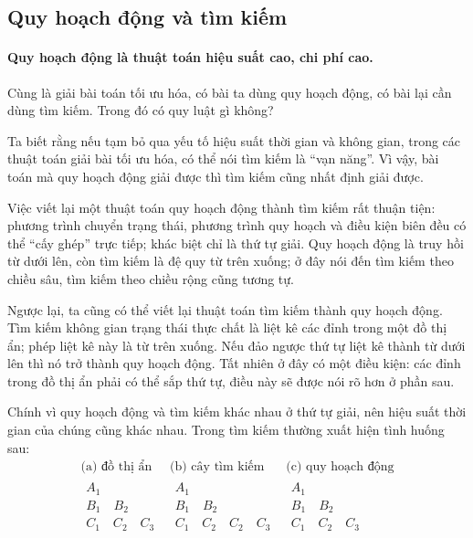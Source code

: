 \documentclass[11pt]{article}
\begin{document}
\subsection{Quy hoạch động và tìm kiếm}

\paragraph{Quy hoạch động là thuật toán hiệu suất cao, chi phí cao.}
Cùng là giải bài toán tối ưu hóa, có bài ta dùng quy hoạch động, có bài lại
cần dùng tìm kiếm. Trong đó có quy luật gì không?

Ta biết rằng nếu tạm bỏ qua yếu tố hiệu suất thời gian và không gian, trong
các thuật toán giải bài tối ưu hóa, có thể nói tìm kiếm là ``vạn năng''. Vì
vậy, bài toán mà quy hoạch động giải được thì tìm kiếm cũng nhất định giải
được.

Việc viết lại một thuật toán quy hoạch động thành tìm kiếm rất thuận tiện:
phương trình chuyển trạng thái, phương trình quy hoạch và điều kiện biên đều
có thể ``cấy ghép'' trực tiếp; khác biệt chỉ là thứ tự giải. Quy hoạch động
là truy hồi từ dưới lên, còn tìm kiếm là đệ quy từ trên xuống; ở đây nói đến
tìm kiếm theo chiều sâu, tìm kiếm theo chiều rộng cũng tương tự.

Ngược lại, ta cũng có thể viết lại thuật toán tìm kiếm thành quy hoạch động.
Tìm kiếm không gian trạng thái thực chất là liệt kê các đỉnh trong một đồ thị
ẩn; phép liệt kê này là từ trên xuống. Nếu đảo ngược thứ tự liệt kê thành từ
dưới lên thì nó trở thành quy hoạch động. Tất nhiên ở đây có một điều kiện:
các đỉnh trong đồ thị ẩn phải có thể sắp thứ tự, điều này sẽ được nói rõ hơn
ở phần sau.

Chính vì quy hoạch động và tìm kiếm khác nhau ở thứ tự giải, nên hiệu suất
thời gian của chúng cũng khác nhau. Trong tìm kiếm thường xuất hiện tình
huống sau:
\[
\begin{array}{ccc}
\text{(a) đồ thị ẩn} & \text{(b) cây tìm kiếm} & \text{(c) quy hoạch động}\\
\begin{array}{c}
A_1\\
B_1\quad B_2\\
C_1\quad C_2\quad C_3
\end{array}
&
\begin{array}{c}
A_1\\
B_1\quad B_2\\
C_1\quad C_2\quad C_2\quad C_3
\end{array}
&
\begin{array}{c}
A_1\\
B_1\quad B_2\\
C_1\quad C_2\quad C_3
\end{array}
\end{array}
\]
\end{document}
